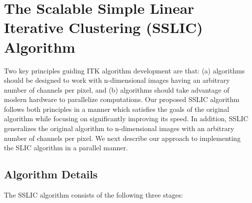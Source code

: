 \documentclass{InsightArticle}
\begin{document}
\section{The Scalable Simple Linear Iterative Clustering (SSLIC) Algorithm}

Two key principles guiding ITK algorithm development are that: (a) algorithms
should be designed to work with n-dimensional images having an arbitrary number of channels per
pixel, and (b) algorithms should take advantage of modern hardware to parallelize
computations. Our proposed SSLIC algorithm follows both principles
in a manner which satisfies the goals of the original algorithm while focusing on
significantly improving its speed. In addition, SSLIC generalizes the original
algorithm to n-dimensional images with an arbitrary number of channels per
pixel. We next describe our approach to implementing the SLIC algorithm in a
parallel manner.

\subsection{Algorithm Details}

The SSLIC algorithm consists of the following three stages:
\end{document}
